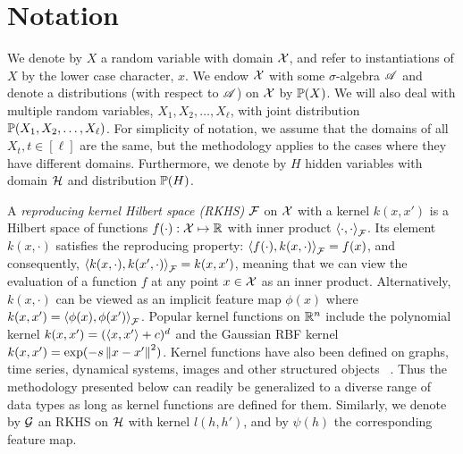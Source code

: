 \documentclass{article}
\begin{document}
\section{Notation}

We denote by $X$ a random variable with domain $\mathcal{X}$,
and refer to instantiations of $X$ by the lower case character, $x$.
We endow $\mathcal{X}$ with some $\sigma$-algebra $\mathscr{A}$ and denote a distributions (with respect to $\mathscr{A}$) on $\mathcal{X}$ by $\mathbb{P}(X)$. We will also deal with multiple random variables, $X_1, X_2, \ldots, X_{\ell}$, with joint distribution $\mathbb{P}(X_1,X_2,\ldots,X_{\ell})$. For simplicity of notation, we assume that the domains of all $X_t, t \in [\ell]$ are the same, but the methodology applies to the cases where they have different domains. Furthermore, we denote by $H$ hidden variables with domain $\mathcal{H}$ and distribution $\mathbb{P}(H)$.

A \emph{reproducing kernel Hilbert space (RKHS)} $\mathcal{F}$ on $\mathcal{X}$ with a kernel $k(x,x')$ is a Hilbert space of
functions $f(\cdot):\mathcal{X} \mapsto \mathbb{R}$ with inner product $\left\langle \cdot,\cdot \right\rangle_{\mathcal{F}}$. Its element $k(x,\cdot)$ satisfies the reproducing property:
$\left\langle f(\cdot),k(x, \cdot) \right\rangle_{\mathcal{F}} = f(x)$, and consequently, $\left\langle k(x,\cdot),k(x', \cdot) \right\rangle_{\mathcal{F}} = k(x,x')$,
meaning that we can view the evaluation of a function $f$ at any point $x\in\mathcal{X}$ as an inner product. Alternatively, $k(x,\cdot)$ can  be viewed as an implicit feature map $\phi(x)$ where $k(x,x')=\left\langle \phi(x),\phi(x') \right\rangle_{\mathcal{F}}$.
Popular kernel functions on $\mathbb{R}^n$ include the polynomial kernel $k(x,x') =
(\left\langle x,x' \right\rangle+c)^d$ and the Gaussian RBF kernel $k(x,x') = \exp(-s
  \left\|x-x'\right\|^2)$. Kernel functions have also been defined on
graphs, time series, dynamical systems, images and other structured
objects \, \cite{SchTsuVer04}. Thus the methodology presented below can  readily be generalized to a diverse range of data types as long as kernel functions are defined for them. Similarly, we denote by $\mathcal{G}$ an RKHS on $\mathcal{H}$ with kernel $l(h,h')$, and by $\psi(h)$ the corresponding feature map.

%
\end{document}
